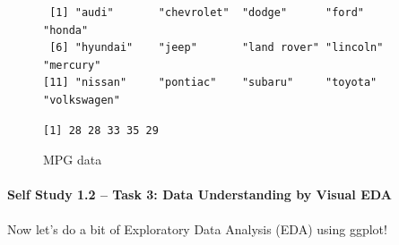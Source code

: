 \documentclass[
  letterpaper,
  DIV=11,
  numbers=noendperiod]{scrartcl}
\let\oldparagraph\paragraph
\renewcommand{\paragraph}[1]{\oldparagraph{#1}\mbox{}}
\begin{document}
\begin{figure}

\begin{minipage}[t]{\linewidth}

{\centering 

\begin{verbatim}
 [1] "audi"       "chevrolet"  "dodge"      "ford"       "honda"     
 [6] "hyundai"    "jeep"       "land rover" "lincoln"    "mercury"   
[11] "nissan"     "pontiac"    "subaru"     "toyota"     "volkswagen"
\end{verbatim}

}

\end{minipage}%
\newline
\begin{minipage}[t]{\linewidth}

{\centering 

}

\end{minipage}%
\newline
\begin{minipage}[t]{\linewidth}

{\centering 

}

\end{minipage}%
\newline
\begin{minipage}[t]{\linewidth}

{\centering 

\begin{verbatim}
[1] 28 28 33 35 29
\end{verbatim}

}

\end{minipage}%

\caption{\label{fig-mpg-skim}MPG data}

\end{figure}

\hypertarget{self-study-1.2-task-3-data-understanding-by-visual-eda}{%
\paragraph{Self Study 1.2 -- Task 3: Data Understanding by Visual
EDA}\label{self-study-1.2-task-3-data-understanding-by-visual-eda}}

Now let's do a bit of Exploratory Data Analysis (EDA) using ggplot!
\end{document}
